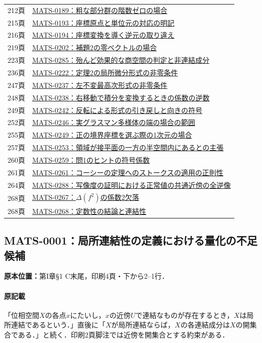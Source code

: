 \documentclass[a4paper,10pt]{ltjsarticle}
\begin{document}
\begin{longtable}{@{}p{.14\linewidth}p{.82\linewidth}@{}}
212頁 & \hyperref[math:MATS-0189]{MATS-0189：粗な部分群の階数ゼロの場合} \\
215頁 & \hyperref[math:MATS-0193]{MATS-0193：座標原点と単位元の対応の明記} \\
216頁 & \hyperref[math:MATS-0194]{MATS-0194：座標変換を導く逆元の取り違え} \\
219頁 & \hyperref[math:MATS-0202]{MATS-0202：補題2の零ベクトルの場合} \\
223頁 & \hyperref[math:MATS-0285]{MATS-0285：殆んど効果的な商空間の判定と非連結成分} \\
236頁 & \hyperref[math:MATS-0222]{MATS-0222：定理2の局所微分形式の非零条件} \\
247頁 & \hyperref[math:MATS-0237]{MATS-0237：左不変最高次形式の非零条件} \\
248頁 & \hyperref[math:MATS-0238]{MATS-0238：右移動で積分を変換するときの係数の逆数} \\
249頁 & \hyperref[math:MATS-0242]{MATS-0242：反転による形式の引き戻しと向きの符号} \\
252頁 & \hyperref[math:MATS-0246]{MATS-0246：実グラスマン多様体の端の場合の範囲} \\
255頁 & \hyperref[math:MATS-0249]{MATS-0249：正の境界座標を選ぶ際の1次元の場合} \\
257頁 & \hyperref[math:MATS-0253]{MATS-0253：領域が接平面の一方の半空間内にあるとの主張} \\
260頁 & \hyperref[math:MATS-0259]{MATS-0259：問1のヒントの符号係数} \\
261頁 & \hyperref[math:MATS-0261]{MATS-0261：コーシーの定理へのストークスの適用の正則性} \\
264頁 & \hyperref[math:MATS-0288]{MATS-0288：写像度の証明における正常値の共通近傍の全逆像} \\
268頁 & \hyperref[math:MATS-0267]{MATS-0267：$\Delta(f^2)$の係数2欠落} \\
268頁 & \hyperref[math:MATS-0268]{MATS-0268：定数性の結論と連結性} \\
\end{longtable}\normalsize

\subsection*{MATS-0001：局所連結性の定義における量化の不足候補}\label{math:MATS-0001}
\noindent\textbf{原本位置：}第I章\S1 C末尾，印刷4頁・下から2--1行．

\paragraph{原記載}「位相空間$X$の各点$x$にたいし，$x$の近傍$U$で連結なものが存在するとき，$X$は局所連結であるという．」直後に「$X$が局所連結ならば，$X$の各連結成分は$X$の開集合である．」と続く．印刷2頁脚注では近傍を開集合とする約束がある．
\end{document}

